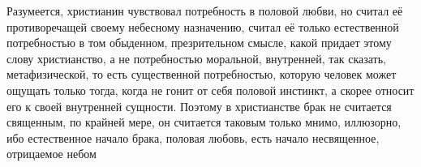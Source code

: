 \documentclass[12pt,oneside]{book}
\begin{document}
Разумеется, христианин чувствовал потребность в половой любви, но считал её противоречащей своему небесному назначению, считал её только естественной потребностью в том обыденном, презрительном смысле, какой придает этому слову христианство, а не потребностью моральной, внутренней, так сказать, метафизической, то есть существенной потребностью, которую человек может ощущать только тогда, когда не гонит от себя половой инстинкт, а скорее относит его к своей внутренней сущности. Поэтому в христианстве брак не считается священным, по крайней мере, он считается таковым только мнимо, иллюзорно, ибо естественное начало брака, половая любовь, есть начало несвященное, отрицаемое небом\ddag\let\svthefootnote\thefootnote\let\thefootnote\relax{}
\end{document}
